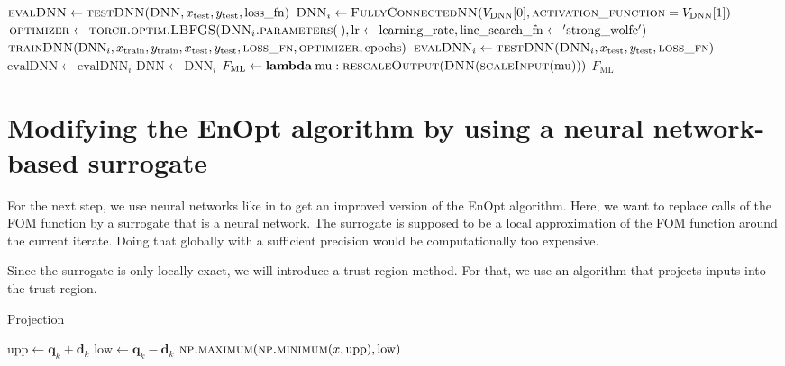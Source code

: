 \begin{algorithm}[H]
\begin{algorithmic}[1]
\State $\textproc{evalDNN} \gets \Call{testDNN}{\textproc{DNN}, x_\mathrm{test}, y_\mathrm{test}, \mathrm{loss\_fn}}$
\State $\textproc{DNN}_i \gets \Call{FullyConnectedNN}{V_\mathrm{DNN}[0], \textproc{activation\_function}=V_\mathrm{DNN}[1]}$
\State $\textproc{optimizer} \gets \Call{torch.optim.LBFGS}{\protect\Call{DNN$_i$.parameters}{\:}, \mathrm{lr}\gets\mathrm{learning\_rate}, \mathrm{line\_search\_fn}\gets\mathrm{'strong\_wolfe'}}$
\State $\Call{trainDNN}{\mathrm{DNN}_i, x_\mathrm{train}, y_\mathrm{train}, x_\mathrm{test}, y_\mathrm{test}, \textproc{loss\_fn}, \textproc{optimizer}, \mathrm{epochs}}$
\State $\textproc{evalDNN}_i \gets \Call{testDNN}{\textproc{DNN}_i, x_\mathrm{test}, y_\mathrm{test}, \textproc{loss\_fn}}$
\State $\mathrm{evalDNN} \gets \mathrm{evalDNN}_i$
\State $\mathrm{DNN} \gets \mathrm{DNN}_i$
\EndIf
\EndFor
\State $F_\mathrm{ML} \gets \mathbf{lambda}\:\mathrm{mu}: \Call{rescaleOutput}{\protect\Call{DNN}{\protect\Call{scaleInput}{\mathrm{mu}}}}$
\State \Return $F_\mathrm{ML}$
\EndFunction
\end{algorithmic}
\end{algorithm}

\section{Modifying the EnOpt algorithm by using a neural network-based surrogate}
 For the next step, we use neural networks like in \cite{Keil2022-dj} to get an improved version of the EnOpt algorithm. Here, we want to replace calls of the FOM function by a surrogate that is a neural network. The surrogate is supposed to be a local approximation of the FOM function around the current iterate. Doing that globally with a sufficient precision would be computationally too expensive.
 
 Since the surrogate is only locally exact, we will introduce a trust region method. For that, we use an algorithm that projects inputs into the trust region.
 
 \begin{algorithm}[H]%
\caption{Projection}
\begin{algorithmic}[1]
\State $\mathrm{upp}\gets\mathbf{q}_k+\mathbf{d}_k$
\State $\mathrm{low}\gets\mathbf{q}_k-\mathbf{d}_k$
\State \Return $\Call{np.maximum}{\protect\Call{np.minimum}{x,\mathrm{upp}},\mathrm{low}}$
\EndFunction
\end{algorithmic}
\end{algorithm}

